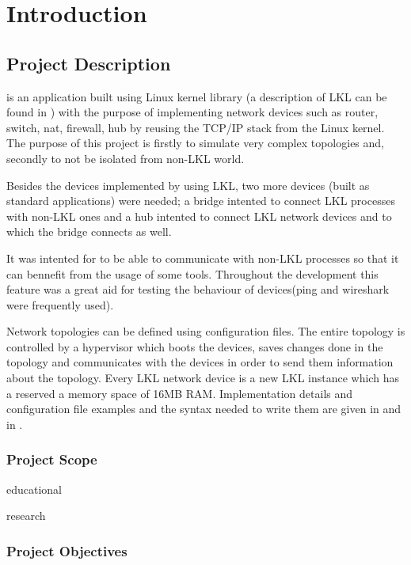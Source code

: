 \chapter{Introduction}
\label{chapter:intro}

\section{Project Description}
\label{sec:proj}

\project is an application built using Linux kernel library (a description of LKL can be found in ) with the purpose of implementing network devices such as router, switch, nat, firewall, hub by reusing the TCP/IP stack from the Linux kernel. The purpose of this project is firstly to simulate very complex topologies and, secondly to not be isolated from non-LKL world.

Besides the devices implemented by using LKL, two more devices (built as standard applications) were needed; a bridge intented to connect LKL processes with non-LKL ones and a hub  intented to connect LKL network devices and to which the bridge connects as well.

It was intented for \project to be able to communicate with non-LKL processes so that it can bennefit from the usage of some tools. Throughout the \project development this feature was a great aid for testing the behaviour of devices(ping and wireshark were frequently used).   

Network topologies can be defined using configuration files. The entire topology is controlled by a hypervisor which boots the devices, saves changes done in the topology and communicates with the devices in order to send them information about the topology.
Every LKL network device is a new LKL instance which has a reserved a memory space of 16MB RAM.
Implementation details and configuration file examples and the syntax needed to write them are given in  and in .
\subsection{Project Scope}
\label{sub-sec:proj-scope}

educational

research

\subsection{Project Objectives}
\label{sub-sec:proj-objectives}

